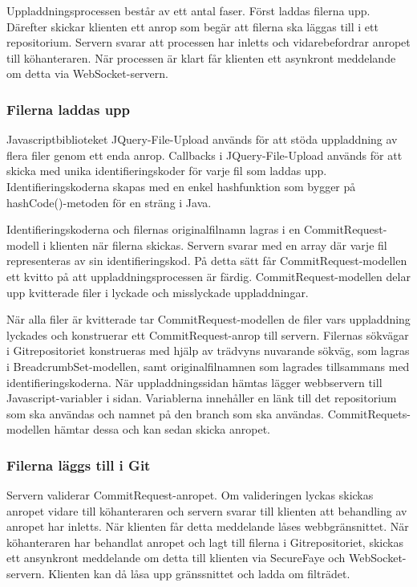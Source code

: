 Uppladdningsprocessen består av ett antal faser. Först laddas filerna upp. Därefter skickar klienten ett anrop som begär att filerna ska läggas till i ett repositorium. Servern svarar att processen har inletts och vidarebefordrar anropet till köhanteraren. När processen är klart får klienten ett asynkront meddelande om detta via WebSocket-servern.

\subsubsection{Filerna laddas upp}

Javascriptbiblioteket JQuery-File-Upload används för att stöda uppladdning av flera filer genom ett enda anrop. 
Callbacks i JQuery-File-Upload används för att skicka med unika identifieringskoder för varje fil som laddas upp. Identifieringskoderna skapas med en enkel hashfunktion som bygger på hashCode()-metoden för en sträng i Java.

Identifieringskoderna och filernas originalfilnamn lagras i en CommitRequest-modell i klienten när filerna skickas. Servern svarar med en array där varje fil representeras av sin identifieringskod. På detta sätt får CommitRequest-modellen ett kvitto på att uppladdningsprocessen är färdig. CommitRequest-modellen delar upp kvitterade filer i lyckade och misslyckade uppladdningar. 

När alla filer är kvitterade tar CommitRequest-modellen de filer vars uppladdning lyckades och konstruerar ett CommitRequest-anrop till servern. Filernas sökvägar i Gitrepositoriet konstrueras med hjälp av trädvyns nuvarande sökväg, som lagras i BreadcrumbSet-modellen, samt originalfilnamnen som lagrades tillsammans med identifieringskoderna.
När uppladdningssidan hämtas lägger webbservern till Javascript-variabler i sidan. Variablerna innehåller en länk till det  repositorium som ska användas och namnet på den branch som ska användas. CommitRequets-modellen hämtar dessa och kan sedan skicka anropet.

\subsubsection{Filerna läggs till i Git}

Servern validerar CommitRequest-anropet. Om valideringen lyckas skickas anropet vidare till köhanteraren och servern svarar till klienten att behandling av anropet har inletts. När klienten får detta meddelande låses webbgränsnittet.
När köhanteraren har behandlat anropet och lagt till filerna i Gitrepositoriet, skickas ett ansynkront meddelande om detta till klienten via SecureFaye och WebSocket-servern. Klienten kan då låsa upp gränssnittet och ladda om filträdet.

